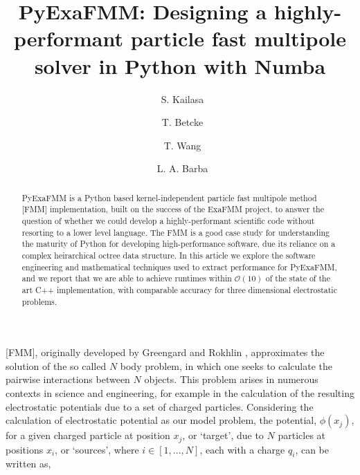 \documentclass{IEEEcsmag}
\begin{document}

\title{PyExaFMM: Designing a highly-performant particle fast multipole solver in Python with Numba}

\author{\ S. Kailasa}

\author{\ T. Betcke}

\author{\ T. Wang}

\author{\ L. A. Barba}


\begin{abstract}
PyExaFMM is a Python based kernel-independent particle fast multipole method [FMM] implementation, built on the success of the ExaFMM project, to answer the question of whether we could develop a highly-performant scientific code without resorting to a lower level language. The FMM is a good case study for understanding the maturity of Python for developing high-performance software, due its reliance on a complex heirarchical octree data structure. In this article we explore the software engineering and mathematical techniques used to extract performance for PyExaFMM, and we report that we are able to achieve runtimes within $\mathcal{O}(10)$ of the state of the art C++ implementation, with comparable accuracy for three dimensional electrostatic problems.

\end{abstract}

\maketitle

 [FMM], originally developed by Greengard and Rokhlin \cite{Greengard1987}, approximates the solution of the so called $N$ body problem, in which one seeks to calculate the pairwise interactions between $N$ objects. This problem arises in numerous contexts in science and engineering, for example in the calculation of the resulting electrostatic potentials due to a set of charged particles. Considering the calculation of electrostatic potential as our model problem, the potential, $\phi(x_j)$, for a given charged particle at position $x_j$, or `target', due to $N$ particles at positions $x_i$, or `sources', where $i \in [1, ..., N]$, each with a charge $q_i$, can be written as,
\end{document}

